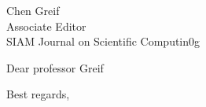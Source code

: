 \documentclass[10pt, a4paper]{letter}
\begin{document}
\begin{letter}{Chen Greif\\
 Associate Editor\\
 SIAM Journal on Scientific Computin0g
}


\opening{Dear professor Greif}
\Blindtext
\closing{Best regards,}


\end{letter}
\end{document}
